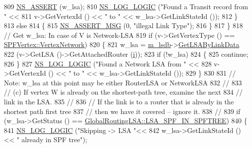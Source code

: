 \begin{DoxyCode}
809               \hyperlink{assert_8h_a6dccdb0de9b252f60088ce281c49d052}{NS\_ASSERT} (w\_lsa);
810               \hyperlink{group__logging_ga88acd260151caf2db9c0fc84997f45ce}{NS\_LOG\_LOGIC} (\textcolor{stringliteral}{"Found a Transit record from "} << 
811                             v->GetVertexId () << \textcolor{stringliteral}{" to "} << w\_lsa->GetLinkStateId ());
812             \}
813           \textcolor{keywordflow}{else} 
814             \{
815               \hyperlink{assert_8h_aff5ece9066c74e681e74999856f08539}{NS\_ASSERT\_MSG} (0, \textcolor{stringliteral}{"illegal Link Type"});
816             \}
817         \}
818 \textcolor{comment}{// Get w\_lsa:  In case of V is Network-LSA}
819       \textcolor{keywordflow}{if} (v->GetVertexType () == \hyperlink{classns3_1_1SPFVertex_a20f8a4cfc99a1b7ecd10a23151b93afda00415acb788d8d95bee545fe2046c2a8}{SPFVertex::VertexNetwork}) 
820         \{
821           w\_lsa = \hyperlink{classns3_1_1GlobalRouteManagerImpl_a7e528f818fa3e6c794b07c0b3cba5f61}{m\_lsdb}->\hyperlink{classns3_1_1GlobalRouteManagerLSDB_aca4c2cb4c36f590198f203cddb30b493}{GetLSAByLinkData} 
822               (v->GetLSA ()->GetAttachedRouter (\hyperlink{bernuolliDistribution_8m_a6f6ccfcf58b31cb6412107d9d5281426}{i}));
823           \textcolor{keywordflow}{if} (!w\_lsa)
824             \{
825               \textcolor{keywordflow}{continue};
826             \}
827           \hyperlink{group__logging_ga88acd260151caf2db9c0fc84997f45ce}{NS\_LOG\_LOGIC} (\textcolor{stringliteral}{"Found a Network LSA from "} << 
828                         v->GetVertexId () << \textcolor{stringliteral}{" to "} << w\_lsa->GetLinkStateId ());
829         \}
830 
831 \textcolor{comment}{// Note:  w\_lsa at this point may be either RouterLSA or NetworkLSA}
832 \textcolor{comment}{//}
833 \textcolor{comment}{// (c) If vertex W is already on the shortest-path tree, examine the next}
834 \textcolor{comment}{// link in the LSA.}
835 \textcolor{comment}{//}
836 \textcolor{comment}{// If the link is to a router that is already in the shortest path first tree}
837 \textcolor{comment}{// then we have it covered -- ignore it.}
838 \textcolor{comment}{//}
839       \textcolor{keywordflow}{if} (w\_lsa->GetStatus () == \hyperlink{classns3_1_1GlobalRoutingLSA_a18bf63da580856fe1cc158aa855af1bda2a14fe5ba992deb9a1cb953f77ec8072}{GlobalRoutingLSA::LSA\_SPF\_IN\_SPFTREE}) 
840         \{
841           \hyperlink{group__logging_ga88acd260151caf2db9c0fc84997f45ce}{NS\_LOG\_LOGIC} (\textcolor{stringliteral}{"Skipping ->  LSA "}<< 
842                         w\_lsa->GetLinkStateId () << \textcolor{stringliteral}{" already in SPF tree"});

\end{DoxyCode}
